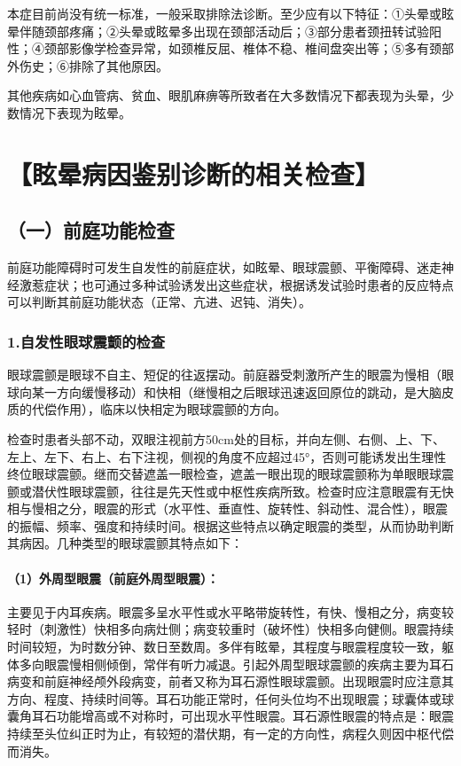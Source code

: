 本症目前尚没有统一标准，一般采取排除法诊断。至少应有以下特征：①头晕或眩晕伴随颈部疼痛；②头晕或眩晕多出现在颈部活动后；③部分患者颈扭转试验阳性；④颈部影像学检查异常，如颈椎反屈、椎体不稳、椎间盘突出等；⑤多有颈部外伤史；⑥排除了其他原因。

其他疾病如心血管病、贫血、眼肌麻痹等所致者在大多数情况下都表现为头晕，少数情况下表现为眩晕。

\section{【眩晕病因鉴别诊断的相关检查】}

\subsection{（一）前庭功能检查}

前庭功能障碍时可发生自发性的前庭症状，如眩晕、眼球震颤、平衡障碍、迷走神经激惹症状；也可通过多种试验诱发出这些症状，根据诱发试验时患者的反应特点可以判断其前庭功能状态（正常、亢进、迟钝、消失）。

\subsubsection{1.自发性眼球震颤的检查}

眼球震颤是眼球不自主、短促的往返摆动。前庭器受刺激所产生的眼震为慢相（眼球向某一方向缓慢移动）和快相（继慢相之后眼球迅速返回原位的跳动，是大脑皮质的代偿作用），临床以快相定为眼球震颤的方向。

检查时患者头部不动，双眼注视前方50cm处的目标，并向左侧、右侧、上、下、左上、左下、右上、右下注视，侧视的角度不应超过45°，否则可能诱发出生理性终位眼球震颤。继而交替遮盖一眼检查，遮盖一眼出现的眼球震颤称为单眼眼球震颤或潜伏性眼球震颤，往往是先天性或中枢性疾病所致。检查时应注意眼震有无快相与慢相之分，眼震的形式（水平性、垂直性、旋转性、斜动性、混合性），眼震的振幅、频率、强度和持续时间。根据这些特点以确定眼震的类型，从而协助判断其病因。几种类型的眼球震颤其特点如下：

\paragraph{（1）外周型眼震（前庭外周型眼震）：}

主要见于内耳疾病。眼震多呈水平性或水平略带旋转性，有快、慢相之分，病变较轻时（刺激性）快相多向病灶侧；病变较重时（破坏性）快相多向健侧。眼震持续时间较短，为时数分钟、数日至数周。多伴有眩晕，其程度与眼震程度较一致，躯体多向眼震慢相侧倾倒，常伴有听力减退。引起外周型眼球震颤的疾病主要为耳石病变和前庭神经颅外段病变，前者又称为耳石源性眼球震颤。出现眼震时应注意其方向、程度、持续时间等。耳石功能正常时，任何头位均不出现眼震；球囊体或球囊角耳石功能增高或不对称时，可出现水平性眼震。耳石源性眼震的特点是：眼震持续至头位纠正时为止，有较短的潜伏期，有一定的方向性，病程久则因中枢代偿而消失。


